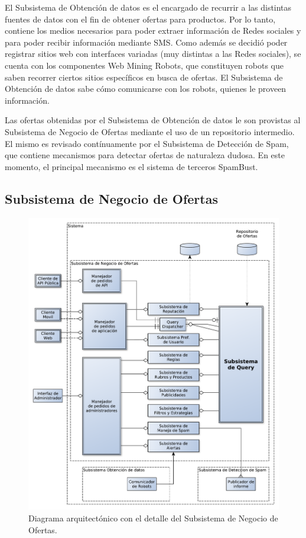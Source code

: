 El \textsf{Subsistema de Obtención de datos} es el encargado de recurrir a las distintas fuentes de datos con el fin de obtener ofertas para productos. Por lo tanto, contiene los medios necesarios para poder extraer información de \textsf{Redes sociales} y para poder recibir información mediante \textsf{SMS}. Como además se decidió poder registrar sitios web con interfaces variadas (muy distintas a las \textsf{Redes sociales}), se cuenta con los componentes \textsf{Web Mining Robots}, que constituyen robots que saben recorrer ciertos sitios específicos en busca de ofertas. El \textsf{Subsistema de Obtención de datos} sabe cómo comunicarse con los robots, quienes le proveen información. 

Las ofertas obtenidas por el \textsf{Subsistema de Obtención de datos} le son provistas al \textsf{Subsistema de Negocio de Ofertas} mediante el uso de un repositorio intermedio.
El mismo es revisado contínuamente por el \textsf{Subsistema de Detección de Spam}, que contiene mecanismos para detectar ofertas de naturaleza dudosa. En este momento, el principal mecanismo es el sistema de terceros \textsf{SpamBust}.

\subsection{Subsistema de Negocio de Ofertas}

\begin{figure}[H]
	\centering
	\includegraphics[width=\textwidth]{graficos/arch/temp_subsistema_que_habla_con_el_usuario.pdf}
	\caption{Diagrama arquitectónico con el detalle del \textsf{Subsistema de Negocio de Ofertas}.}\label{arch:neg_ofertas}
\end{figure}

